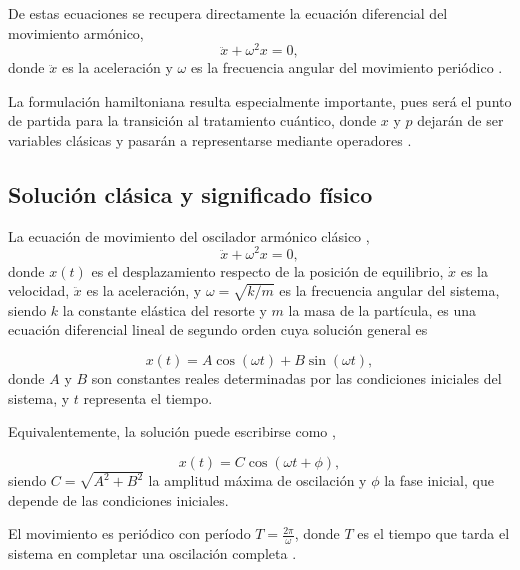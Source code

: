 De estas ecuaciones se recupera directamente la ecuación diferencial del movimiento armónico,
\vspace{-15pt}
\begin{equation}
	\ddot{x} + \omega^2 x = 0,
\end{equation} donde $\ddot{x}$ es la aceleración y $\omega$ es la frecuencia angular del movimiento periódico \citep{newton1687}.

La formulación hamiltoniana resulta especialmente importante, pues será el punto de partida para la transición al tratamiento cuántico, donde $x$ y $p$ dejarán de ser variables clásicas y pasarán a representarse mediante operadores \citep{dirac1930}.

\subsection{Solución clásica y significado físico}

La ecuación de movimiento del oscilador armónico clásico \citep{newton1687, hamilton1834},
\vspace{-15pt}
\begin{equation}
	\ddot{x} + \omega^2 x = 0,
\end{equation} donde $x(t)$ es el desplazamiento respecto de la posición de equilibrio, 
$\dot{x}$ es la velocidad,
$\ddot{x}$ es la aceleración,
y $\omega = \sqrt{k/m}$ es la frecuencia angular del sistema, 
siendo $k$ la constante elástica del resorte y $m$ la masa de la partícula,
es una ecuación diferencial lineal de segundo orden cuya solución general es

\vspace{-15pt}
\begin{equation}
	x(t) = A \cos(\omega t) + B \sin(\omega t),
\end{equation} donde $A$ y $B$ son constantes reales determinadas por las condiciones iniciales del sistema, y $t$ representa el tiempo.

Equivalentemente, la solución puede escribirse como \citep{newton1687},

\vspace{-15pt}
\begin{equation}
	x(t) = C \cos(\omega t + \phi),
\end{equation} siendo $C = \sqrt{A^2 + B^2}$ la amplitud máxima de oscilación y $\phi$ la fase inicial, que depende de las condiciones iniciales.

El movimiento es periódico con período $T = \frac{2\pi}{\omega}$, donde $T$ es el tiempo que tarda el sistema en completar una oscilación completa \citep{newton1687}.


